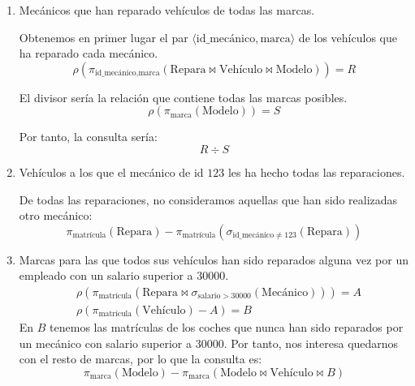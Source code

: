 \begin{ejercicio}
\begin{enumerate}
        \item Mecánicos que han reparado vehículos de todas las marcas.
        
        Obtenemos en primer lugar el par $\langle \text{id\_mecánico}, \text{marca} \rangle$ de los vehículos que ha reparado cada mecánico.
        \begin{equation*}
            \rho\left(\pi_{\text{id\_mecánico},\text{marca}}(\text{Repara}\bowtie \text{Vehículo}\bowtie \text{Modelo})\right) = R
        \end{equation*}

        El divisor sería la relación que contiene todas las marcas posibles.
        \begin{equation*}
            \rho(\pi_{\text{marca}}(\text{Modelo})) = S
        \end{equation*}

        Por tanto, la consulta sería:
        \begin{equation*}
            R \div S
        \end{equation*}

        \item Vehículos a los que el mecánico de id $123$ les ha hecho todas las reparaciones.
        
        De todas las reparaciones, no consideramos aquellas que han sido realizadas otro mecánico:
        \begin{equation*}
            \pi_{\text{matrícula}}(\text{Repara}) - \pi_{\text{matrícula}}(\sigma_{\text{id\_mecánico} \neq 123}(\text{Repara}))
        \end{equation*}
        \item Marcas para las que todos sus vehículos han sido reparados alguna vez por un empleado con un salario superior a $30000$.
        \begin{align*}
            &\rho(\pi_{\text{matrícula}}(\text{Repara} \bowtie \sigma_{\text{salario} > 30000}(\text{Mecánico}))) = A\\
            &\rho(\pi_{\text{matrícula}}(\text{Vehículo}) - A) = B
        \end{align*}
        En $B$ tenemos las matrículas de los coches que nunca han sido reparados por un mecánico con salario superior a $30000$.
        Por tanto, nos interesa quedarnos con el resto de marcas, por lo que la consulta es:
        \begin{equation*}
            \pi_{\text{marca}}(\text{Modelo}) - \pi_{\text{marca}}(\text{Modelo}\bowtie \text{Vehículo}\bowtie B)
        \end{equation*}


\end{enumerate}
\end{ejercicio}
